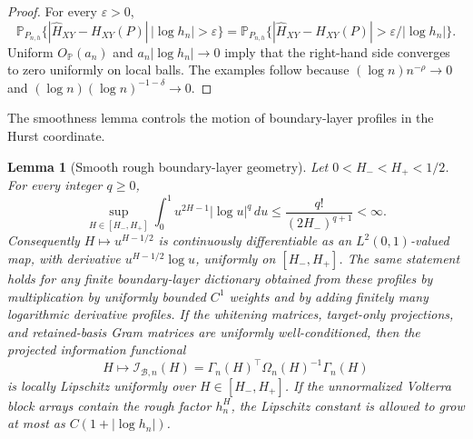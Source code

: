 \documentclass[11pt,a4paper]{amsart}
\theoremstyle{plain}
\newtheorem{lemma}[theorem]{Lemma}
\theoremstyle{definition}
\theoremstyle{remark}
\newcommand{\PP}{\mathbb{P}}
\newcommand{\dd}{\,d}
\newcommand{\scrB}{\mathcal{B}}
\newcommand{\scrI}{\mathcal{I}}
\begin{document}
\begin{proof}
For every \(\varepsilon>0\),
\[
        \PP_{P_{n,h}}
        \{|\widehat H_{XY}-H_{XY}(P)|\,|\log h_n|>\varepsilon\}
        =
        \PP_{P_{n,h}}
        \{|\widehat H_{XY}-H_{XY}(P)|>\varepsilon/|\log h_n|\}.
\]
Uniform \(O_{\PP}(a_n)\) and \(a_n|\log h_n|\to0\) imply that the right-hand side converges to zero
uniformly on local balls.  The examples follow because
\((\log n)n^{-\rho}\to0\) and
\((\log n)(\log n)^{-1-\delta}\to0\).
\end{proof}

The smoothness lemma controls the motion of boundary-layer profiles in the Hurst coordinate.

\begin{lemma}[Smooth rough boundary-layer geometry]\label{lem:pilot-profile-smoothness}
Let \(0<H_-<H_+<1/2\).  For every integer \(q\ge0\),
\[
        \sup_{H\in[H_-,H_+]}
        \int_0^1 u^{2H-1}|\log u|^q\dd u
        \le
        \frac{q!}{(2H_-)^{q+1}}
        <\infty .
\]
Consequently \(H\mapsto u^{H-1/2}\) is continuously differentiable as an \(L^2(0,1)\)-valued map,
with derivative \(u^{H-1/2}\log u\), uniformly on \([H_-,H_+]\).  The same statement holds for any
finite boundary-layer dictionary obtained from these profiles by multiplication by uniformly
bounded \(C^1\) weights and by adding finitely many logarithmic derivative profiles.  If the
whitening matrices, target-only projections, and retained-basis Gram matrices are uniformly
well-conditioned, then the projected information functional
\[
        H\mapsto \scrI_{\scrB,n}(H)
        =
        \Gamma_n(H)^\top\Omega_n(H)^{-1}\Gamma_n(H)
\]
is locally Lipschitz uniformly over \(H\in[H_-,H_+]\).  If the unnormalized Volterra block arrays
contain the rough factor \(h_n^H\), the Lipschitz constant is allowed to grow at most as
\(C(1+|\log h_n|)\).
\end{lemma}
\end{document}

